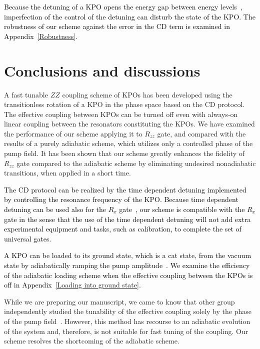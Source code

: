 \documentclass[%
 reprint,
 amsmath,amssymb,
 aps,
pra,
]{revtex4-2}
\begin{document}
\textcolor{black}{
Because the detuning of a KPO opens the energy gap between energy levels~\cite{Goto2016b}, imperfection of the control of the detuning can disturb the state of the KPO.  
The robustness of our scheme against the error in the CD term is examined in Appendix~\ref{Robustness}.}


\section{Conclusions and discussions}
A fast tunable $ZZ$ coupling scheme of KPOs has been developed using the transitionless rotation of a KPO in the phase space based on the CD protocol.
The effective coupling between KPOs can be turned off even with always-on linear coupling between the resonators constituting the KPOs. 
We have examined the performance of our scheme applying it to $R_{zz}$ gate, and compared with the results of a purely adiabatic scheme, which utilizes only a controlled phase of the pump field.
It has been shown that our scheme greatly enhances the fidelity of $R_{zz}$ gate compared to the adiabatic scheme by eliminating undesired nonadiabatic transitions, when applied in a short time. 


\textcolor{black}{
The CD protocol can be realized by the time dependent detuning implemented by controlling the resonance frequency of the KPO. 
Because time dependent detuning can be used also for the $R_x$ gate~\cite{Goto2016b}, our scheme is compatible with the $R_x$ gate in the sense that the use of the time dependent detuning will not add extra experimental equipment and tasks, such as calibration, to complete the set of universal gates. }

\textcolor{black}{A KPO can be loaded to its ground state, which is a cat state, from the vacuum state by adiabatically ramping the pump amplitude~\cite{Cochrane1999,Goto2016}.
We examine the efficiency of the adiabatic loading scheme when the effective coupling between the KPOs is off in Appendix~\ref{Loading into ground state}.}

While we are preparing our manuscript, we came to know that other group independently studied the tunability of the effective coupling solely by the phase of the pump field~\cite{NEC_paper}. 
However, this method has recourse to an adiabatic evolution of the system and, therefore, is not suitable for fast tuning of the coupling. Our scheme resolves the shortcoming of the adiabatic scheme. 
\end{document}
